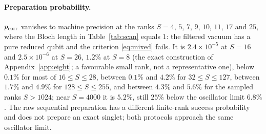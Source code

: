 \documentclass[11pt,a4paper]{article}
\begin{document}
\paragraph{Preparation probability.}
$p_{\rm corr}$ vanishes to machine precision at the ranks $S=4$, $5$, $7$, $9$, $10$, $11$, $17$ and $25$, where the Bloch length in Table~\ref{tab:scan} equals $1$: the filtered vacuum has a pure reduced qubit and the criterion \eqref{eq:mixed} fails. It is $2.4\times10^{-5}$ at $S=16$ and $2.5\times10^{-6}$ at $S=26$, $1.2\%$ at $S=8$ (the exact construction of Appendix~\ref{app:eight}; a favourable small rank, not a representative one), below $0.1\%$ for most of $16\le S\le28$, between $0.1\%$ and $4.2\%$ for $32\le S\le127$, between $1.7\%$ and $4.9\%$ for $128\le S\le255$, and between $4.3\%$ and $5.6\%$ for the sampled ranks $S>1024$; near $S=4000$ it is $5.2\%$, still $25\%$ below the oscillator limit $6.8\%$. The raw sequential preparation has a different finite-rank success probability and does not prepare an exact singlet; both protocols approach the same oscillator limit.
\end{document}
